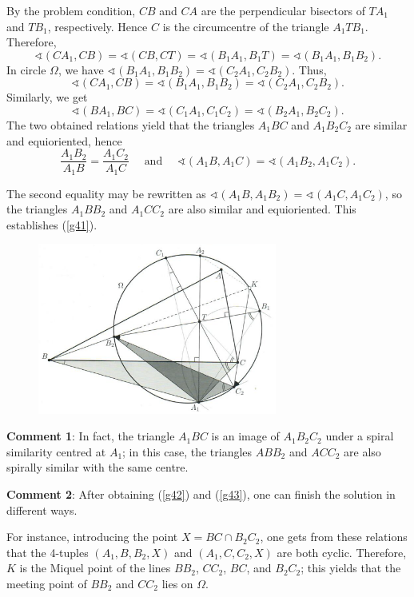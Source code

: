 \documentclass[a4paper, 12pt]{article}
\begin{document}
\begin{enumerate}
By the problem condition, $CB$ and $CA$ are the perpendicular bisectors of $TA_1$ and $TB_1$, respectively. Hence $C$ is the circumcentre of the triangle $A_1 T B_1$. Therefore,
$$
\sphericalangle (CA_1, CB) = \sphericalangle (CB, CT) = \sphericalangle (B_1 A_1, B_1T) = \sphericalangle (B_1 A_1, B_1 B_2).
$$
In circle $\Omega$, we have $\sphericalangle (B_1 A_1, B_1 B_2) = \sphericalangle (C_2 A_1, C_2 B_2)$. Thus,
$$
\sphericalangle(CA_1, CB) = \sphericalangle(B_1 A_1, B_1 B_2) = \sphericalangle(C_2 A_1, C_2 B_2).
$$
Similarly, we get
$$
\sphericalangle (BA_1, BC) = \sphericalangle (C_1 A_1, C_1 C_2) = \sphericalangle (B_2 A_1, B_2 C_2).
$$
The two obtained relations yield that the triangles $A_1 BC$ and $A_1 B_2 C_2$ are similar and equioriented, hence
$$
\frac{A_1 B_2}{A_1 B} = \frac{A_1 C_2}{A_1 C} \quad 
\textrm{ and } \quad 
\sphericalangle(A_1 B, A_1 C) = \sphericalangle (A_1 B_2, A_1 C_2).
$$

The second equality may be rewritten as $\sphericalangle(A_1 B, A_1 B_2) = \sphericalangle (A_1 C, A_1 C_2)$, so the triangles $A_1 B B_2$ and $A_1 C C_2$ are also similar and equioriented. This establishes (\ref{g41}).

\begin{figure}[h]
    \centering
    \includegraphics[width = 0.7\textwidth]{2018_G4}
\end{figure}

\textbf{Comment 1}:  In fact, the triangle $A_1 B C$ is an image of $A_1 B_2 C_2$ under a spiral similarity centred at $A_1$; in this case, the triangles $A B B_2$ and $A C C_2$ are also spirally similar with the same centre.

\textbf{Comment 2}:  After obtaining (\ref{g42}) and (\ref{g43}), one can finish the solution in different ways.

For instance, introducing the point $X =  BC \cap B_2 C_2$, one gets from these relations that the 4-tuples $(A_1, B, B_2, X)$ and $(A_1, C, C_2, X)$ are both cyclic. Therefore, $K$ is the Miquel point of the lines $BB_2$, $CC_2$, $BC$, and $B_2 C_2$; this yields that the meeting point of $BB_2$ and $CC_2$ lies on $\Omega$.


\end{enumerate}
\end{document}
